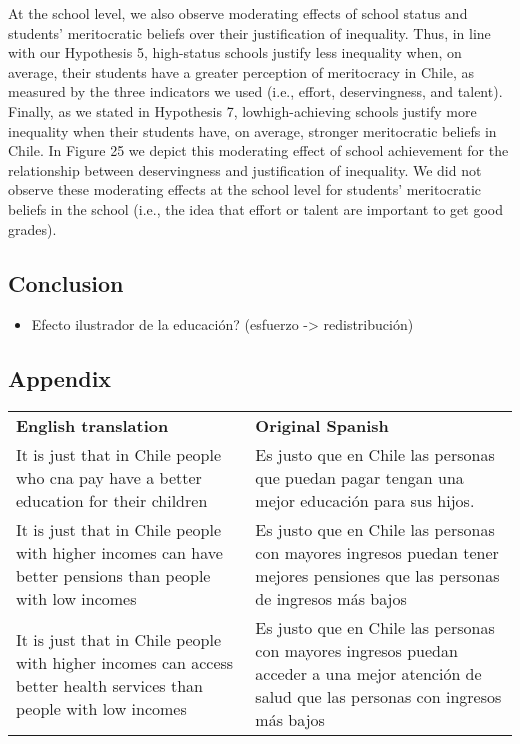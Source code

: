\documentclass[
  letterpaper,
  DIV=11,
  numbers=noendperiod]{scrartcl}
\providecommand{\tightlist}{%
  \setlength{\itemsep}{0pt}\setlength{\parskip}{0pt}}\usepackage{longtable,booktabs,array}
\begin{document}
At the school level, we also observe moderating effects of school status
and students' meritocratic beliefs over their justification of
inequality. Thus, in line with our Hypothesis 5, high-status schools
justify less inequality when, on average, their students have a greater
perception of meritocracy in Chile, as measured by the three indicators
we used (i.e., effort, deservingness, and talent). Finally, as we stated
in Hypothesis 7, lowhigh-achieving schools justify more inequality when
their students have, on average, stronger meritocratic beliefs in Chile.
In Figure 25 we depict this moderating effect of school achievement for
the relationship between deservingness and justification of inequality.
We did not observe these moderating effects at the school level for
students' meritocratic beliefs in the school (i.e., the idea that effort
or talent are important to get good grades).

\hypertarget{conclusion}{%
\subsection{Conclusion}\label{conclusion}}

\begin{itemize}
\tightlist
\item
  Efecto ilustrador de la educación? (esfuerzo -\textgreater{}
  redistribución)
\end{itemize}

\hypertarget{appendix}{%
\subsection{Appendix}\label{appendix}}

\begin{longtable}[]{@{}
  >{\raggedright\arraybackslash}p{}
  >{\raggedright\arraybackslash}p{}@{}}
\toprule\noalign{}
\endhead
\bottomrule\noalign{}
\endlastfoot
\textbf{English translation} & \textbf{Original Spanish} \\
It is just that in Chile people who cna pay have a better education for
their children & Es justo que en Chile las personas que puedan pagar
tengan una mejor educación para sus hijos. \\
It is just that in Chile people with higher incomes can have better
pensions than people with low incomes & Es justo que en Chile las
personas con mayores ingresos puedan tener mejores pensiones que las
personas de ingresos más bajos \\
It is just that in Chile people with higher incomes can access better
health services than people with low incomes & Es justo que en Chile las
personas con mayores ingresos puedan acceder a una mejor atención de
salud que las personas con ingresos más bajos \\
\end{longtable}
\end{document}
